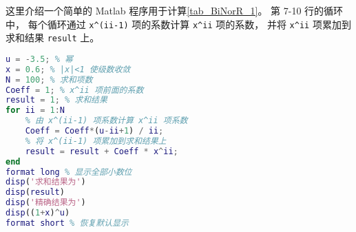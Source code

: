 
这里介绍一个简单的 Matlab 程序用于计算\autoref{tab_BiNorR_1}。 第 7-10 行的循环中， 每个循环通过 \verb`x^(ii-1)` 项的系数计算 \verb`x^ii` 项的系数， 并将 \verb`x^ii` 项累加到求和结果 \verb`result` 上。

\begin{lstlisting}[language=matlab, caption=binorR.m]
% 验证二项式定理(非整数幂)
u = -3.5; % 幂
x = 0.6; % |x|<1 使级数收敛
N = 100; % 求和项数
Coeff = 1; % x^ii 项前面的系数
result = 1; % 求和结果
for ii = 1:N
    % 由 x^(ii-1) 项系数计算 x^ii 项系数
    Coeff = Coeff*(u-ii+1) / ii; 
    % 将 x^(ii-1) 项累加到求和结果上
    result = result + Coeff * x^ii; 
end
format long % 显示全部小数位
disp('求和结果为')
disp(result)
disp('精确结果为')
disp((1+x)^u)
format short % 恢复默认显示
\end{lstlisting}
